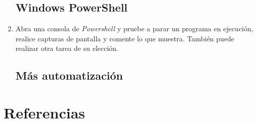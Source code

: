 \documentclass[paper=a4, fontsize=11pt]{scrartcl} %
\numberwithin{equation}{section} %
\numberwithin{figure}{section} %
\numberwithin{table}{section} %
\begin{document}
\begin{enumerate}
	\subsection{Windows PowerShell}
	\item Abra una consola de \textit{Powershell} y pruebe a parar un programa en ejecución, realice
	capturas de pantalla y comente lo que muestra. También puede realizar otra tarea de su elección.
	
	\subsection{Más automatización}
	
\end{enumerate}

\newpage
\section{Referencias}

\end{document}
